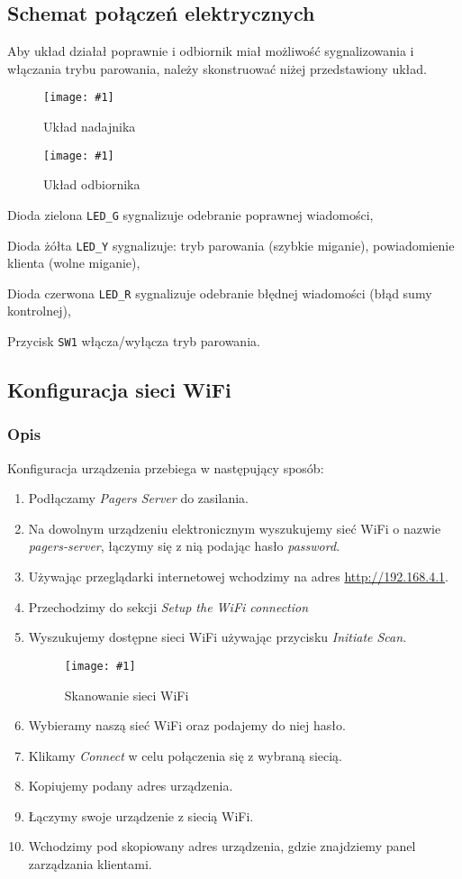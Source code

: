 \documentclass[12pt]{article}
\let\tempone\itemize
\let\temptwo\enditemize
\renewenvironment{itemize}{\tempone\setlength{\itemsep}{0cm}}{\temptwo}
\newcommand{\imgcustomsize}[3]{
	\begin{figure}[H]
		\centering
		\texttt{[image: \#1]}
		\caption{#2}
	\end{figure}
}
\newcommand{\img}[2]{\imgcustomsize{#1}{#2}{0.8}}
\begin{document}
        \subsection{Schemat połączeń elektrycznych}
        \label{uruchomienie}
        Aby układ działał poprawnie i odbiornik miał możliwość sygnalizowania i włączania trybu parowania, należy skonstruować niżej przedstawiony układ.
		\imgcustomsize{sch/tx}{Układ nadajnika}{0.6}
		\imgcustomsize{sch/rx}{Układ odbiornika}{0.8}
		\begin{itemize}
			\item Dioda zielona \lstinline|LED_G| sygnalizuje odebranie poprawnej wiadomości,
			\item Dioda żółta \lstinline|LED_Y| sygnalizuje: tryb parowania (szybkie miganie), powiadomienie klienta (wolne miganie),
			\item Dioda czerwona \lstinline|LED_R| sygnalizuje odebranie błędnej wiadomości (błąd sumy kontrolnej),
			\item Przycisk \lstinline|SW1| włącza/wyłącza tryb parowania.
		\end{itemize}
		
        
        \subsection{Konfiguracja sieci WiFi}
        \subsubsection{Opis}
        Konfiguracja urządzenia przebiega w następujący sposób:
        \begin{enumerate}
            \item Podłączamy \emph{Pagers Server} do zasilania.
            \item Na dowolnym urządzeniu elektronicznym wyszukujemy sieć WiFi o nazwie \mbox{\emph{pagers-server}}, łączymy się z nią podając hasło \mbox{\emph{password}}.
            \item Używając przeglądarki internetowej wchodzimy na adres \url{http://192.168.4.1}.
            \item Przechodzimy do sekcji \emph{Setup the WiFi connection}
            \item Wyszukujemy dostępne sieci WiFi używając przycisku \emph{Initiate Scan}.
            \img{config/scan_init}{Skanowanie sieci WiFi}
            \item Wybieramy naszą sieć WiFi oraz podajemy do niej hasło.
            \item Klikamy \emph{Connect} w celu połączenia się z wybraną siecią.
            \item Kopiujemy podany adres urządzenia.
            \item Łączymy swoje urządzenie z siecią WiFi.
            \item Wchodzimy pod skopiowany adres urządzenia, gdzie znajdziemy panel zarządzania klientami.
        \end{enumerate}
\end{document}
